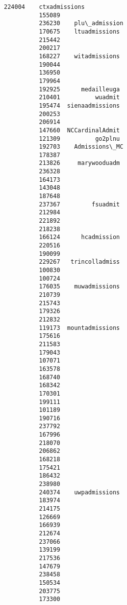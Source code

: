 \documentclass[11pt]{article}
\begin{document}
\begin{Verbatim}[commandchars=\\\{\}]
          224004    ctxadmissions  
          155089                   
          236230    plu\_admission  
          170675    ltuadmissions  
          215442                   
          200217                   
          168227    witadmissions  
          190044                   
          136950                   
          179964                   
          192925      medailleuga  
          210401          wuadmit  
          195474  sienaadmissions  
          200253                   
          206914                   
          147660  NCCardinalAdmit  
          121309          go2plnu  
          192703    Admissions\_MC  
          178387                   
          213826     marywooduadm  
          236328                   
          164173                   
          143048                   
          187648                   
          237367         fsuadmit  
          212984                   
          221892                   
          218238                   
          166124      hcadmission  
          220516                   
          190099                   
          229267   trincolladmiss  
          100830                   
          100724                   
          176035    muwadmissions  
          210739                   
          215743                   
          179326                   
          212832                   
          119173  mountadmissions  
          175616                   
          211583                   
          179043                   
          107071                   
          163578                   
          168740                   
          168342                   
          170301                   
          199111                   
          101189                   
          190716                   
          237792                   
          167996                   
          218070                   
          206862                   
          168218                   
          175421                   
          186432                   
          238980                   
          240374    uwpadmissions  
          183974                   
          214175                   
          126669                   
          166939                   
          212674                   
          237066                   
          139199                   
          217536                   
          147679                   
          238458                   
          150534                   
          203775                   
          173300                   

\end{Verbatim}
\end{document}
